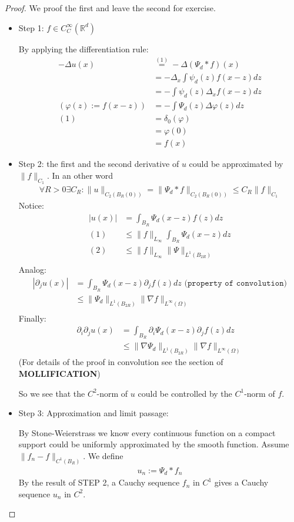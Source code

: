 \begin{proof}We proof the first and leave the second for exercise.
	\begin{itemize}
		\item Step 1: $f \in C^\infty_C(\mathbb{R}^d)$\par 
		By applying the differentiation rule:
		\begin{align*}
			-\Delta u(x) &\overset{(1)}{=} -\Delta (\Psi_d * f)(x)\\
			&= -\Delta_x \int \psi_d(z) f(x-z) dz\\
			&= -\int \psi_d(z) \Delta_x f(x - z) dz \\
			(\varphi(z):= f(x-z))
			&= -\int \Psi_d(z) \Delta \varphi(z) dz\\
			(1)&= \delta_0(\varphi)\\
			&= \varphi(0)\\
			&= f(x)
		\end{align*}
		\item Step 2: the first and the second derivative of $u$ could be approximated by $\|f\|_{C_1}$. In an other word
		\begin{align*}
			\forall R > 0 \exists C_R: 
			\|u\|_{C_2(B_{R}(0))} = \|\Psi_d*f\|_{C_2(B_{R}(0))}
			            \leq C_R \|f\|_{C_1}
		\end{align*}
		Notice:
		\begin{align*}
			|u(x)| &= \int_{B_R} \Psi_d(x-z) f(z) dz\\
			(1)&\leq \|f\|_{L_\infty} \int_{B_R} \Psi_d(x-z)dz\\
			(2)&\leq \|f\|_{L_\infty} \|\Psi\|_{L^1(B_{2R})} \\
		\end{align*}
		Analog:
		\begin{align*}
			|\partial_j u(x)| &= \int_{B_R}  \Psi_d(x-z) \partial_j f(z)dz \texttt{ (property of convolution)}\\
			&\leq \|\Psi_d\|_{L^1(B_{2R})} \|\nabla f\|_{L^\infty(\Omega)}  \\ 
		\end{align*}
		Finally:
		\begin{align*}
			\partial_i \partial_j u(x) &= \int_{B_R} \partial_i\Psi_d(x-z) \partial_j f(z) dz\\
			&\leq \|\nabla \Psi_d\|_{L^1(B_{2R})} \|\nabla f\|_{L^\infty(\Omega)}
		\end{align*}
		(For details of the proof in convolution see the section of \textbf{MOLLIFICATION})\par
		So we see that the $C^2$-norm of $u$ could be controlled by the $C^1$-norm of $f$.
		\item Step 3: Approximation and limit passage:\par 
		By Stone-Weierstrass we know every continuous function on a compact support could be uniformly approximated by the smooth function. Assume $\|f_n - f \|_{C^1(B_R)}$. We define
		\begin{align*}
			u_n:= \Psi_d * f_n
		\end{align*}
		By the result of STEP 2, a Cauchy sequence $f_n$ in $C^1$ gives a Cauchy sequence $u_n$ in $C^2$.
	\end{itemize}
\end{proof}

